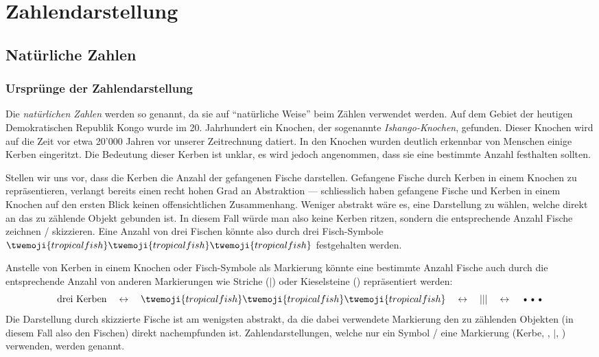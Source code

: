 \chapter{Zahlendarstellung}

\section{Natürliche Zahlen}

\subsection{Ursprünge der Zahlendarstellung}
Die \textit{natürlichen Zahlen} werden so genannt, da sie auf \enquote{natürliche Weise} beim Zählen verwendet werden.
Auf dem Gebiet der heutigen Demokratischen Republik Kongo wurde im 20. Jahrhundert ein Knochen, der sogenannte \textit{Ishango-Knochen}, gefunden.
Dieser Knochen wird auf die Zeit vor etwa 20'000 Jahren vor unserer Zeitrechnung datiert.
In den Knochen wurden deutlich erkennbar von Menschen einige Kerben eingeritzt.
Die Bedeutung dieser Kerben ist unklar, es wird jedoch angenommen, dass sie eine bestimmte Anzahl festhalten sollten.

Stellen wir uns vor, dass die Kerben die Anzahl der gefangenen Fische darstellen.
Gefangene Fische durch Kerben in einem Knochen zu repräsentieren, verlangt bereits einen recht hohen Grad an
Abstraktion --- schliesslich haben gefangene Fische und Kerben in einem Knochen auf den ersten Blick keinen offensichtlichen Zusammenhang.
Weniger abstrakt wäre es, eine Darstellung zu wählen, welche direkt an das zu zählende Objekt gebunden ist.
In diesem Fall würde man also keine Kerben ritzen, sondern die entsprechende Anzahl Fische zeichnen / skizzieren.
Eine Anzahl von drei Fischen könnte also durch drei Fisch-Symbole $\twemoji{tropical fish}\twemoji{tropical fish}\twemoji{tropical fish}$
festgehalten werden.

Anstelle von Kerben in einem Knochen oder Fisch-Symbole als Markierung könnte eine bestimmte Anzahl Fische auch durch
die entsprechende Anzahl von anderen Markierungen wie Striche ($|$) oder Kieselsteine (\textbullet) repräsentiert werden:
\begin{equation*}
	\text{drei Kerben} \quad\leftrightarrow\quad \twemoji{tropical fish}\twemoji{tropical fish}\twemoji{tropical fish} \quad\leftrightarrow\quad |||
	\quad\leftrightarrow\quad \text{\textbullet\textbullet\textbullet}
\end{equation*}
Die Darstellung durch skizzierte Fische ist am wenigsten abstrakt, da die dabei verwendete Markierung den zu zählenden Objekten (in diesem Fall also den Fischen) direkt nachempfunden ist.
Zahlendarstellungen, welche nur ein Symbol / eine Markierung (Kerbe, , $|$, \textbullet) verwenden, werden
 genannt.

